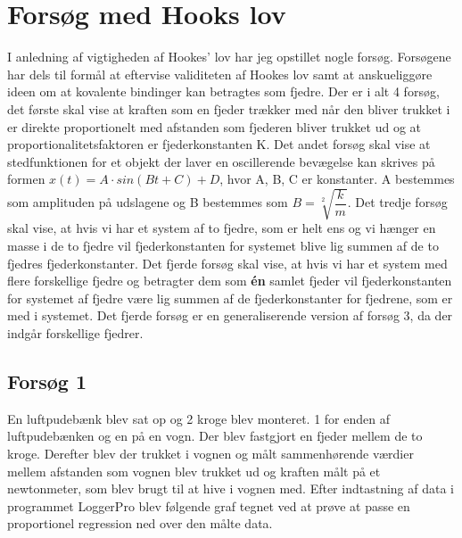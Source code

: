 \section{Forsøg med Hooks lov}
I anledning af vigtigheden af Hookes' lov har jeg opstillet nogle forsøg. Forsøgene har dels til formål at eftervise validiteten af Hookes lov samt at anskueliggøre ideen om at kovalente bindinger kan betragtes som fjedre. Der er i alt 4 forsøg, det første skal vise at kraften som en fjeder trækker med når den bliver trukket i er direkte proportionelt med afstanden som fjederen bliver trukket ud og at proportionalitetsfaktoren er fjederkonstanten K. Det andet forsøg skal vise at stedfunktionen for et objekt der laver en oscillerende bevægelse kan skrives på formen $x(t) = A \cdot sin(B t + C) + D$, hvor A, B, C er konstanter. A bestemmes som amplituden på udslagene og B bestemmes som $B=\sqrt[2]{\dfrac{k}{m}}$. Det tredje forsøg skal vise, at hvis vi har et system af to fjedre, som er helt ens og vi hænger en masse i de to fjedre vil fjederkonstanten for systemet blive lig summen af de to fjedres fjederkonstanter. Det fjerde forsøg skal vise, at hvis vi har et system med flere forskellige fjedre og betragter dem som \textbf{én} samlet fjeder vil fjederkonstanten for systemet af fjedre være lig summen af de fjederkonstanter for fjedrene, som er med i systemet. Det fjerde forsøg er en generaliserende version af forsøg 3, da der indgår forskellige fjedrer. 

\subsection{Forsøg 1}
En luftpudebænk blev sat op og 2 kroge blev monteret. 1 for enden af luftpudebænken og en på en vogn. Der blev fastgjort en fjeder mellem de to kroge. Derefter blev der trukket i vognen og målt sammenhørende værdier mellem afstanden som vognen blev trukket ud og kraften målt på et newtonmeter, som blev brugt til at hive i vognen med. Efter indtastning af data i programmet LoggerPro blev følgende graf tegnet ved at prøve at passe en proportionel regression ned over den målte data. 

